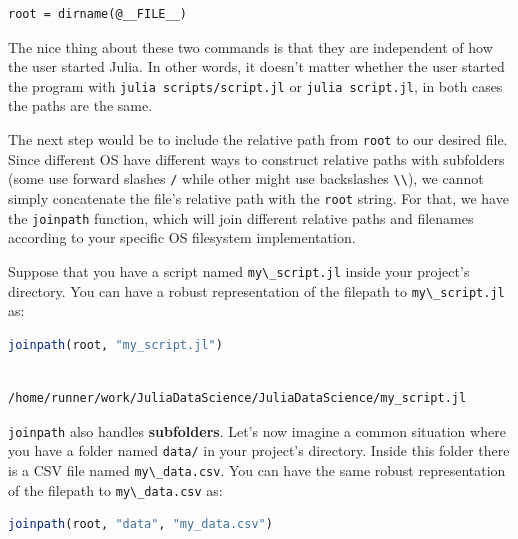 \documentclass[
  notoc %
]{tufte-book}
\newcommand{\passthrough}[1]{#1}
\begin{document}
\begin{lstlisting}
root = dirname(@__FILE__)
\end{lstlisting}

The nice thing about these two commands is that they are independent of
how the user started Julia. In other words, it doesn't matter whether
the user started the program with
\passthrough{\lstinline!julia scripts/script.jl!} or
\passthrough{\lstinline!julia script.jl!}, in both cases the paths are
the same.

The next step would be to include the relative path from
\passthrough{\lstinline!root!} to our desired file. Since different OS
have different ways to construct relative paths with subfolders (some
use forward slashes \passthrough{\lstinline!/!} while other might use
backslashes \passthrough{\lstinline!\\!}), we cannot simply concatenate
the file's relative path with the \passthrough{\lstinline!root!} string.
For that, we have the \passthrough{\lstinline!joinpath!} function, which
will join different relative paths and filenames according to your
specific OS filesystem implementation.

Suppose that you have a script named
\passthrough{\lstinline!my\_script.jl!} inside your project's directory.
You can have a robust representation of the filepath to
\passthrough{\lstinline!my\_script.jl!} as:

\begin{lstlisting}[language=Julia]
joinpath(root, "my_script.jl")
\end{lstlisting}

\begin{lstlisting}[language=Output]

/home/runner/work/JuliaDataScience/JuliaDataScience/my_script.jl

\end{lstlisting}

\passthrough{\lstinline!joinpath!} also handles \textbf{subfolders}.
Let's now imagine a common situation where you have a folder named
\passthrough{\lstinline!data/!} in your project's directory. Inside this
folder there is a CSV file named \passthrough{\lstinline!my\_data.csv!}.
You can have the same robust representation of the filepath to
\passthrough{\lstinline!my\_data.csv!} as:

\begin{lstlisting}[language=Julia]
joinpath(root, "data", "my_data.csv")
\end{lstlisting}
\end{document}
